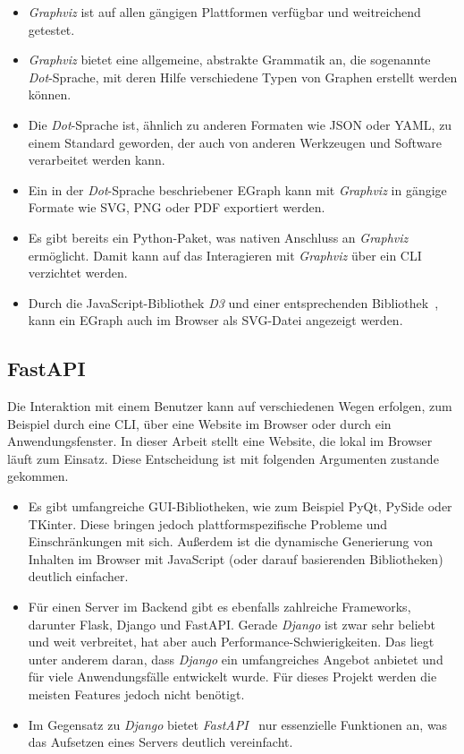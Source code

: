 \begin{itemize}
    \item \textit{Graphviz} ist auf allen gängigen Plattformen verfügbar und weitreichend getestet.
    \item \textit{Graphviz} bietet eine allgemeine, abstrakte Grammatik an, die sogenannte \textit{Dot}-Sprache, mit deren Hilfe verschiedene Typen von Graphen erstellt werden können.
    \item Die \textit{Dot}-Sprache ist, ähnlich zu anderen Formaten wie JSON oder YAML, zu einem Standard geworden, der auch von anderen Werkzeugen und Software verarbeitet werden kann.
    \item Ein in der \textit{Dot}-Sprache beschriebener EGraph kann mit \textit{Graphviz} in gängige Formate wie SVG, PNG oder PDF exportiert werden.
    \item Es gibt bereits ein Python-Paket, was nativen Anschluss an \textit{Graphviz} ermöglicht. Damit kann auf das Interagieren mit \textit{Graphviz} über ein CLI verzichtet werden.
    \item Durch die JavaScript-Bibliothek \textit{D3} und einer entsprechenden Bibliothek~\cite{d3-graphviz}, kann ein EGraph auch im Browser als SVG-Datei angezeigt werden.
\end{itemize}

\subsection{FastAPI}

Die Interaktion mit einem Benutzer kann auf verschiedenen Wegen erfolgen, zum Beispiel durch eine CLI, über eine Website im Browser oder durch ein Anwendungsfenster.
In dieser Arbeit stellt eine Website, die lokal im Browser läuft zum Einsatz. Diese Entscheidung ist mit folgenden Argumenten zustande gekommen. 

\begin{itemize}
    \item Es gibt umfangreiche GUI-Bibliotheken, wie zum Beispiel PyQt, PySide oder TKinter. Diese bringen jedoch plattformspezifische Probleme und Einschränkungen mit sich.
    Außerdem ist die dynamische Generierung von Inhalten im Browser mit JavaScript (oder darauf basierenden Bibliotheken) deutlich einfacher.
    \item Für einen Server im Backend gibt es ebenfalls zahlreiche Frameworks, darunter Flask, Django und FastAPI.
    Gerade \textit{Django} ist zwar sehr beliebt und weit verbreitet, hat aber auch Performance-Schwierigkeiten.
    Das liegt unter anderem daran, dass \textit{Django} ein umfangreiches Angebot anbietet und für viele Anwendungsfälle entwickelt wurde.
    Für dieses Projekt werden die meisten Features jedoch nicht benötigt.
    \item Im Gegensatz zu \textit{Django} bietet \textit{FastAPI}~\cite{fastapi} nur essenzielle Funktionen an, was das Aufsetzen eines Servers deutlich vereinfacht.
\end{itemize}

